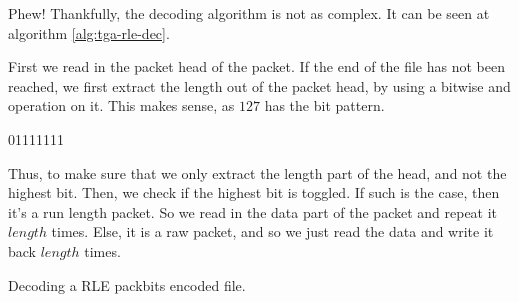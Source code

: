 \begin{refsection}
\begin{algorithm}[h]
\begin{algorithmic}[1]
        \Else


            \State {}

          \Else


          \EndIf

        \EndIf
      \EndIf


    \EndWhile

        \State {}
      \Else
        \State {}
      \EndIf
    \EndIf
  \end{algorithmic}
\end{algorithm}

Phew! Thankfully, the decoding algorithm is not as complex. It can be
seen at algorithm \ref{alg:tga-rle-dec}.

First we read in the packet head of the packet. If the end of the file
has not been reached, we first extract the length out of the packet
head, by using a bitwise and operation on it. This makes sense, as
$127$ has the bit pattern.

\begin{indentpar}
  01111111
\end{indentpar}

Thus, to make sure that we only extract the length part of the head, and
not the highest bit. Then, we check if the highest bit is toggled. If
such is the case, then it's a run length packet. So we read in the
data part of the packet and repeat it $length$ times. Else, it is a
raw packet, and so we just read the data and write it back $length$
times.

\begin{algorithm}[h]
  \caption{Decoding a RLE packbits encoded file.}
  \label{alg:tga-rle-dec}
  \begin{algorithmic}[1]



\end{algorithmic}
\end{algorithm}
\end{refsection}
